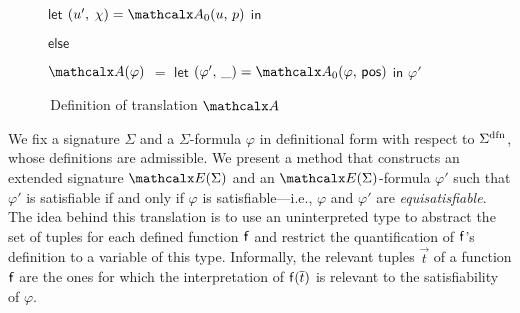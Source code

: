 \begin{figure}[t]
\begin{enumerate}
\begin{itemize}
\begin{itemize}
      \itemx[] $\mathsf{let}$ $( u',\, \chi ) = \conv_0( u,\, p )$ $\mathsf{in}$ 
    \end{itemize}
   \itemx[] $\mathsf{else}$
   \begin{itemize}
     \itemx[] \return {}
   \end{itemize}
 \end{itemize}
\end{enumerate}
\begin{enumerate}
\itemx[\ ]
$\conv( \varphi )$ $=$ $\mathsf{let}$ $( \varphi',\, \_ ) = \conv_0( \varphi,\, \ppos )$ $\mathsf{in}$ $\varphi'$
\end{enumerate}
\caption{\,Definition of translation $\conv$}
\label{fig:A}
\end{figure}

We fix a signature $\Sigma$ and a $\Sigma$-formula
$\varphi$ in definitional form with respect to $\sfundefs{\Sigma}$,
whose definitions are admissible.
We present a method that constructs an extended signature
$\extendsig{ \Sigma }$ and an $\extendsig{ \Sigma }$-formula $\varphi'$ such that
$\varphi'$ is satisfiable if and only if $\varphi$ is satisfiable---i.e.,
$\varphi$ and $\varphi'$ are \emph{equisatisfiable}.
The idea behind this translation
is to use an uninterpreted type to abstract the set of
 tuples for each defined function $\mathsf{f}$ and restrict the
quantification of $\mathsf{f}$'s definition to a variable of this
type. Informally, the relevant tuples $\vec t$ of a function $\mathsf{f}$ are the
ones for which the interpretation of $\mathsf{f}( \overline{t} )$ is relevant to the
satisfiability of $\varphi$.

